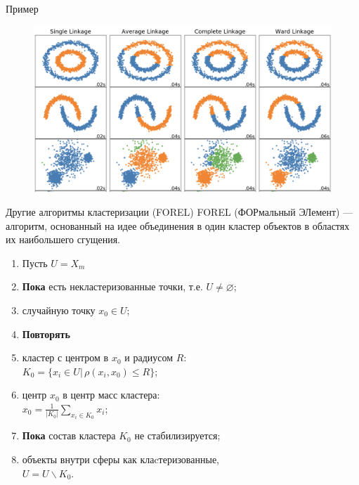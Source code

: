 \documentclass{beamer}
\begin{document}
\begin{frame}{Пример}
	\begin{figure}
	\includegraphics[scale = 0.25]{metrics.png}
	\end{figure}
\end{frame}

\begin{frame}{Другие алгоритмы кластеризации (FOREL)}
   FOREL (ФОРмальный ЭЛемент) --- алгоритм, основанный на идее объединения в один кластер объектов в областях их наибольшего сгущения.
   \vspace{2\ex}
   \begin{enumerate}
       \item Пусть $U = X_m$
       \item \textbf{Пока} есть некластеризованные точки, т.е. $U \neq \varnothing$;
       \item {} случайную точку $x_0 \in U$;
       \item \quad\textbf{Повторять}
       \item \quad{} кластер с центром в $x_0$ и радиусом $R$:\\
       \quad\quad $K_0 = \{x_i \in U |\, \rho(x_i, x_0) \leq R\}$;
       \item \quad{} центр $x_0$ в центр масс кластера:\\
       \quad\quad $x_0 = \frac{1}{|K_0|}\sum\limits_{x_i \in K_0}x_i$;
       \item \quad\textbf{Пока} состав кластера $K_0$ не стабилизируется;
       \item {} объекты внутри сферы как клаcтеризованные,\\ \quad $U = U \backslash K_0$.
   \end{enumerate}
\end{frame}
\end{document}
